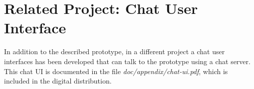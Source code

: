 \section{Related Project: Chat User Interface}
\label{chatui}
In addition to the described prototype, in a different
project a chat user interfaces has been
developed that can talk to the prototype using a chat server.
This chat UI is documented in the file \textit{doc/appendix/chat-ui.pdf},
which is included in the digital distribution.
